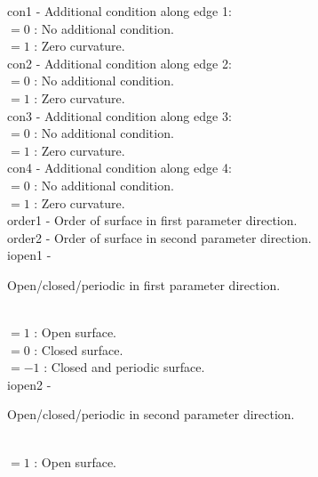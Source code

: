         \>\>    {\fov con1} \> - \> Additional condition along edge 1:\\
                      \>\>\>\>\> $= 0$ : No additional condition.\\
                      \>\>\>\>\> $= 1$ : Zero curvature.\\
        \>\>    {\fov con2} \> - \> Additional condition along edge 2:\\
                      \>\>\>\>\> $= 0$ : No additional condition.\\
                      \>\>\>\>\> $= 1$ : Zero curvature.\\
        \>\>    {\fov con3} \> - \> Additional condition along edge 3:\\
                      \>\>\>\>\> $= 0$ : No additional condition.\\
                      \>\>\>\>\> $= 1$ : Zero curvature.\\
        \>\>    {\fov con4} \> - \> Additional condition along edge 4:\\
                      \>\>\>\>\> $= 0$ : No additional condition.\\
                      \>\>\>\>\> $= 1$ : Zero curvature.\\
        \>\>    {\fov order1}\> - \> Order of surface in first parameter
                                     direction.\\
        \>\>    {\fov order2}\> - \> Order of surface in second
                                     parameter direction.\\
        \>\>    {\fov iopen1}\> - \>
                     \begin{minipg2}
                       Open/closed/periodic in first parameter direction.
                     \end{minipg2}\\
                      \>\>\>\>\> $= 1$ \> : Open surface.\\
                      \>\>\>\>\> $= 0$ \> : Closed surface.\\
                      \>\>\>\>\> $= -1$ \> : Closed and periodic
                      surface.\\
        \>\>    {\fov iopen2}\> - \>
                     \begin{minipg2}
                       Open/closed/periodic in second parameter direction.
                     \end{minipg2}\\
                      \>\>\>\>\> $= 1$ \> : Open surface.\\
